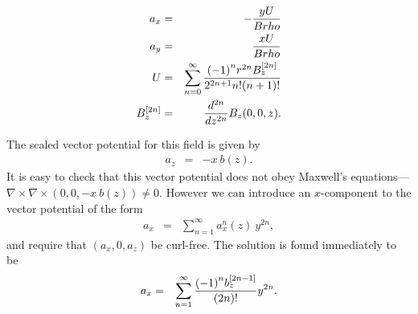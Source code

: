 \documentclass[11pt]{article} %
\begin{document}
\begin{eqnarray}{a}_{x}&=
&-{yU \over Brho}\nonumber \\
 {a}_{y}&=
&{xU \over Brho}\nonumber \\
 U&=
&\sum\limits_{n=
0}^{\infty } {(-1{)}^{n}{r}^{2n}{B}_{z}^{\left[{2n}\right]} \over {2}^{2n+1}n!(n+1)!}\nonumber \\
 {B}_{z}^{\left[{2n}\right]}&=
&{{d}^{2n} \over d{z}^{2n}}{B}_{z}(0,0,z).\nonumber 
\end{eqnarray}



The scaled vector potential for this field is given by 
%
\begin{eqnarray}{a}_{z}&=
&-x\ b(z).\end{eqnarray}
%
It is easy to check that this vector potential does not obey Maxwell's equations---%
$\nabla \times \nabla \times \left({0,0,-x\ b(z)}\right)\ne 0$.
However we can introduce an $x$-component to the vector potential of the form
%
\begin{eqnarray}{a}_{x}&=
&\sum\limits_{n=
1}^{\infty } {a}_{x}^{n}(z)\ {y}^{2n},\end{eqnarray}
%
and require that 
%
$\left({{a}_{x},0,{a}_{z}}\right)$
be curl-free.  The solution is found  immediately to be 
%
\begin{eqnarray}{a}_{x}&=
&\sum\limits_{n=
1}^{\infty } {{(-1)}^{n}{b}_{z}^{\left[{2n-1}\right]} \over (2n)!}{y}^{2n}.\label{bendax}\end{eqnarray}
%
\end{document}
